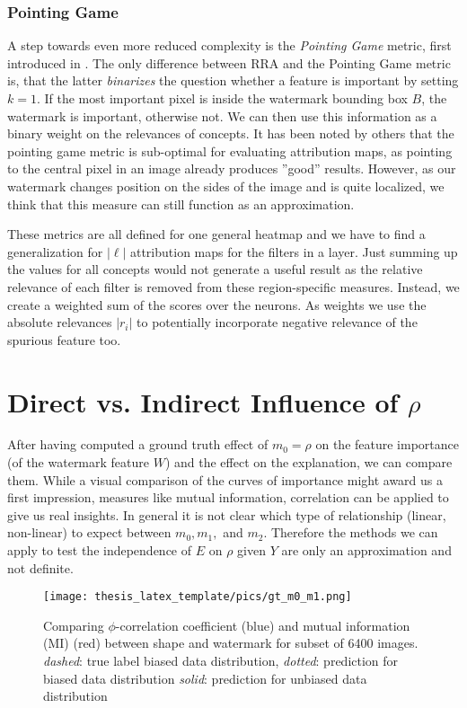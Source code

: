 \subsubsection{Pointing Game}
A step towards even more reduced complexity is the \textit{Pointing Game} metric, first introduced in \cite{Zhang2016}. The only difference between RRA and the Pointing Game metric is, that the latter \textit{binarizes} the question whether a feature is important by setting $k = 1$. If the most important pixel is inside the watermark bounding box $B$, the watermark is important, otherwise not.
We can then use this information as a binary weight on the relevances of concepts. 
It has been noted by others that the pointing game metric is sub-optimal for evaluating attribution maps, as pointing to the central pixel in an image already produces ''good'' results. However, as our watermark changes position on the sides of the image and is quite localized, we think that this measure can still function as an approximation. 

These metrics are all defined for one general heatmap and we have to find a generalization for $|\ell|$ attribution maps for the filters in a layer. Just summing up the values for all concepts would not generate a useful result as the relative relevance of each filter is removed from these region-specific measures. Instead, we create a weighted sum of the scores over the neurons. As weights we use the absolute relevances $|r_i|$ to potentially incorporate negative relevance of the spurious feature too. 

\section{Direct vs. Indirect Influence of $\rho$}
After having computed a ground truth effect of $m_0 = \rho$ on the feature importance (of the watermark feature $W$) and the effect on the explanation, we can compare them.
While a visual comparison of the curves of importance might award us a first impression, measures like mutual information, correlation can be applied to give us real insights. 
In general it is not clear which type of relationship (linear, non-linear) to expect between $m_0, m_1, $ and $m_2$. Therefore the methods we can apply to test the independence of $E$ on $\rho$ given $Y$ are only an approximation and not definite.

\begin{figure}
    \centering
    \texttt{[image: thesis\_latex\_template/pics/gt\_m0\_m1.png]}
    \caption[$m_0$ vs. $m_1$]{Comparing $\phi$-correlation coefficient (blue) and mutual information (MI) (red) between shape and watermark for subset of 6400 images. \\ \textit{dashed}: true label biased data distribution, \textit{dotted}: prediction for biased data distribution \textit{solid}: prediction for unbiased data distribution }
    \label{fig:m0_m1}
\end{figure}

